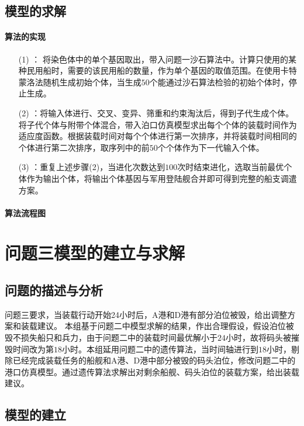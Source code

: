 \documentclass{whutmod}
\begin{document}
     \subsection{模型的求解}
   	 \paragraph{算法的实现}
   	 	\begin{itemize}
   	 	\item [(1)]： 将染色体中的单个基因取出，带入问题一沙石算法中。计算只使用的某种民用船时，需要的该民用船的数量，作为单个基因的取值范围。在使用卡特蒙洛法随机生成初始个体，当生成$50$个能通过沙石算法检验的初始个体时，停止生成。
   	 	\item [(2)]：将输入体进行、交叉、变异、筛重和约束淘汰后，得到子代生成个体。将子代个体与附带个体混合，带入泊口仿真模型求出每个个体的装载时间作为适应度函数。根据装载时间对每个个体进行第一次排序，并将装载时间相同的个体进行第二次排序，取序列中的前$50$个个体作为下一代输入个体。
   	 	\item [(3)]：重复上述步骤(2)，当进化次数达到$100$次时结束进化，选取当前最优个体作为输出个体，将输出个体基因与军用登陆舰合并即可得到完整的船支调遣方案。
   	 	 \end{itemize}
     \paragraph{算法流程图}
     
     
     \section{问题三模型的建立与求解}
   	\subsection{问题的描述与分析}
   	问题三要求，当装载行动开始24小时后，A港和D港有部分泊位被毁，给出调整方案和装载建议。
   	本组基于问题二中模型求解的结果，作出合理假设，假设泊位被毁不损失船只和兵力，由于问题二中的装载时间最优解小于$24$小时，故将码头被摧毁时间改为第$18$小时。本组延用问题二中的遗传算法，当时间轴进行到$18$小时，剔除已经完成装载任务的船舰和A港、D港中部分被毁的码头泊位，修改问题二中的港口仿真模型。通过遗传算法求解出对剩余船舰、码头泊位的装载方案，给出装载建议。
   	
   	
  \subsection{模型的建立}
\end{document}

